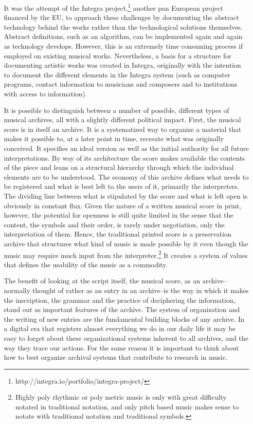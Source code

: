\documentclass[11pt,a4paper]{article}
\begin{document}
It was the attempt of the Integra project,\footnote{http://integra.io/portfolio/integra-project/} another pan European project financed by the EU, to approach these challenges by documenting the abstract technology behind the works rather than the technological solutions themselves. Abstract definitions, such as an algorithm, can be implemented again and again as technology develops. However, this is an extremely time consuming process if employed on existing musical works. Nevertheless, a basis for a structure for documenting artistic works was created in Integra, originally with the intention to document the different elements in the Integra system (such as computer programs, contact information to musicians and composers and to institutions with access to information).

It is possible to distinguish between a number of possible, different types of musical archives, all with a slightly different political impact. First, the musical score is in itself an archive. It is a systematized way to organize a material that makes it possible to, at a later point in time, recreate what was originally conceived. It specifies an ideal version as well as the initial authority for all future interpretations. By way of its architecture the score makes available the contents of the piece and leans on a structural hierarchy through which the individual elements are to be understood. The economy of this archive defines what needs to be registered and what is best left to the users of it, primarily the interpreters. The dividing line between what is stipulated by the score and what is left open is obviously in constant flux. Given the nature of a written musical score in print, however, the potential for openness is still quite limited in the sense that the content, the symbols and their order, is rarely under negotiation, only the interpretation of them. Hence, the traditional printed score is a preservation archive that structures what kind of music is made possible by it even though the music may require much input from the interpreter.\footnote{Highly poly rhythmic or poly metric music is only with great difficulty notated in traditional notation, and only pitch based music makes sense to notate with traditional notation and traditional symbols.} It creates a system of values that defines the usability of the music as a commodity.

The benefit of looking at the script itself, the musical score, as an archive--normally thought of rather as an entry in an archive--is the way in which it makes the inscription, the grammar and the practice of deciphering the information, stand out as important features of the archive. The system of organization and the writing of new entries are the fundamental building blocks of any archive. In a digital era that registers almost everything we do in our daily life it may be easy to forget about these organizational systems inherent to all archives, and the way they trace our actions. For the same reason it is important to think about how to best organize archival systems that contribute to research in music.
\end{document}
